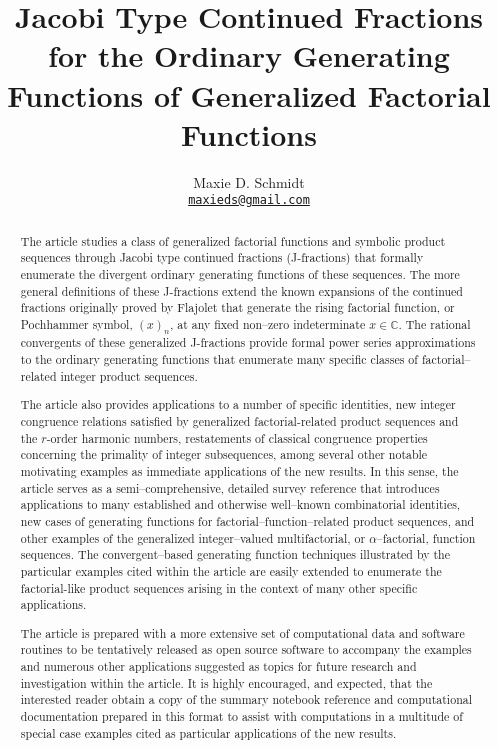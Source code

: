 \documentclass[12pt,reqno]{article}
\title{Jacobi Type Continued Fractions for the 
       Ordinary Generating Functions of 
       Generalized Factorial Functions}
\author{Maxie D. Schmidt \\ 
        \href{mailto:maxieds@gmail.com}{\nolinkurl{maxieds@gmail.com}}}
\date{}
\numberwithin{sfootnote}{section}
\numberwithin{equation}{section}
\theoremstyle{DefaultTheoremStyle}
\theoremstyle{definition}
\begin{document}

\maketitle

\begin{abstract} 
The article studies a class of generalized factorial functions 
and symbolic product sequences 
through Jacobi type continued fractions (J-fractions) that 
formally enumerate the divergent ordinary generating functions of 
these sequences. 
The more general definitions of 
these J-fractions extend the known expansions of the 
continued fractions originally proved by Flajolet 
that generate the rising factorial function, or 
Pochhammer symbol, $(x)_n$, at any fixed non--zero 
indeterminate $x \in \mathbb{C}$. 
The rational convergents of these generalized J-fractions 
provide formal power series approximations to the 
ordinary generating functions that enumerate many specific classes of 
factorial--related integer product sequences. 

The article also provides applications to a number of specific identities, 
new integer congruence relations satisfied by 
generalized factorial-related product sequences and the 
$r$-order harmonic numbers, 
restatements of classical congruence properties concerning the 
primality of integer subsequences, among several other notable 
motivating examples as immediate applications of the new results. 
In this sense, the article serves as a 
semi--comprehensive, detailed survey reference that 
introduces applications to many established and 
otherwise well--known combinatorial identities, 
new cases of generating functions for factorial--function--related 
product sequences, and other examples of the generalized 
integer--valued multifactorial, or $\alpha$--factorial, function sequences. 
The convergent--based generating function techniques illustrated by the 
particular examples cited within the article 
are easily extended to enumerate the 
factorial-like product sequences arising in the context of 
many other specific applications. 

The article is prepared with a more extensive set of 
computational data and software routines to be tentatively 
released as open source software to accompany the examples and 
numerous other applications suggested as topics for future 
research and investigation within the article. 
It is highly encouraged, and expected, that the 
interested reader obtain a copy of the summary notebook reference and 
computational documentation prepared in this format to 
assist with computations in a multitude of special case examples cited as 
particular applications of the new results. 
\end{abstract} 
\end{document}
